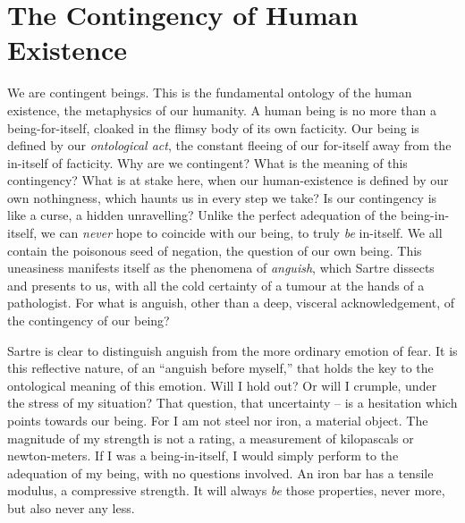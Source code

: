 \chapter{The Contingency of Human Existence}


We are contingent beings. This is the fundamental ontology of the human existence, the metaphysics of our humanity. A human being is no more than a being-for-itself, cloaked in the flimsy body of its own facticity. Our being is defined by our \emph{ontological act}, the constant fleeing of our for-itself away from the in-itself of facticity. Why are we contingent? What is the meaning of this contingency? What is at stake here, when our human-existence is defined by our own nothingness, which haunts us in every step we take? Is our contingency is like a curse, a hidden unravelling? Unlike the perfect adequation of the being-in-itself, we can \emph{never} hope to coincide with our being, to truly \emph{be} in-itself. We all contain the poisonous seed of negation, the question of our own being. This uneasiness manifests itself as the phenomena of \emph{anguish}, which Sartre dissects and presents to us, with all the cold certainty of a tumour at the hands of a pathologist. For what is anguish, other than a deep, visceral acknowledgement, of the contingency of our being?


Sartre is clear to distinguish anguish from the more ordinary emotion of fear.  It is this reflective nature, of an \enquote{anguish before myself,} that holds the key to the ontological meaning of this emotion.
Will I hold out? Or will I crumple, under the stress of my situation?
That question, that uncertainty -- is a hesitation which points towards our being. For I am not steel nor iron, a material object.
The magnitude of my strength is not a rating, a measurement of kilopascals or newton-meters. If I was a being-in-itself, I would simply perform to the adequation of my being, with no questions involved. An iron bar has a tensile modulus, a compressive strength. It will always \emph{be} those properties, never more, but also never any less.

